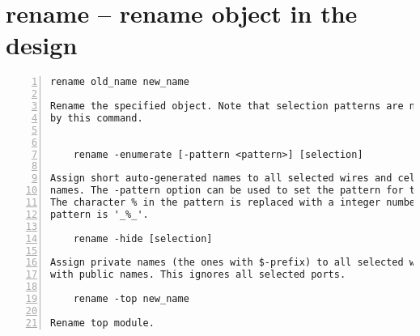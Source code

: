 \section{rename -- rename object in the design}
\label{cmd:rename}
\begin{lstlisting}[numbers=left,frame=single]
    rename old_name new_name

Rename the specified object. Note that selection patterns are not supported
by this command.


    rename -enumerate [-pattern <pattern>] [selection]

Assign short auto-generated names to all selected wires and cells with private
names. The -pattern option can be used to set the pattern for the new names.
The character % in the pattern is replaced with a integer number. The default
pattern is '_%_'.

    rename -hide [selection]

Assign private names (the ones with $-prefix) to all selected wires and cells
with public names. This ignores all selected ports.

    rename -top new_name

Rename top module.
\end{lstlisting}

